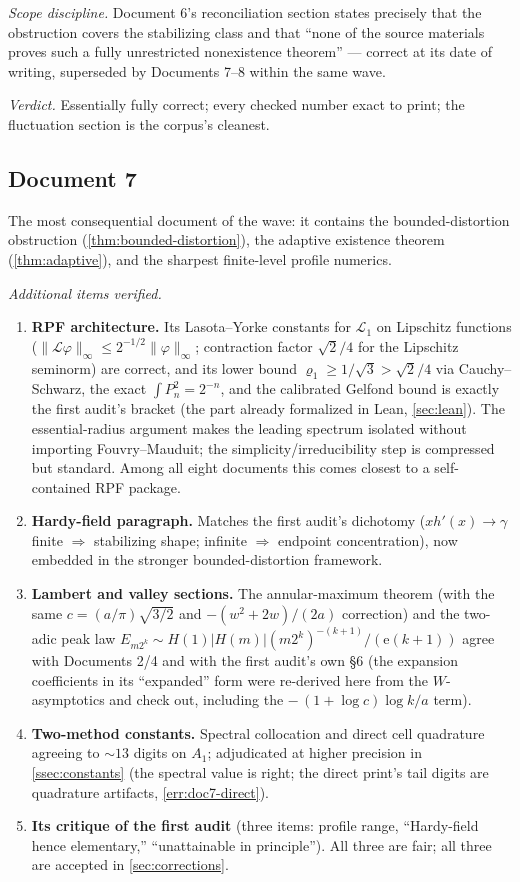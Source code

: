 \documentclass[11pt,oneside]{article}
\theoremstyle{definition}
\theoremstyle{remark}
\newcommand{\e}{\mathrm e}
\newcommand{\Lop}{\mathcal L}
\begin{document}
\emph{Scope discipline.}  Document 6's reconciliation section states
precisely that the obstruction covers the stabilizing class and that
``none of the source materials proves such a fully unrestricted
nonexistence theorem'' --- correct at its date of writing, superseded
by Documents 7--8 within the same wave.

\emph{Verdict.}  Essentially fully correct; every checked number exact
to print; the fluctuation section is the corpus's cleanest.

\subsection{Document 7}
\label{ssec:doc7}

The most consequential document of the wave: it contains the
bounded-distortion obstruction (\cref{thm:bounded-distortion}), the
adaptive existence theorem (\cref{thm:adaptive}), and the sharpest
finite-level profile numerics.

\emph{Additional items verified.}
\begin{enumerate}
\item \textbf{RPF architecture.}  Its Lasota--Yorke constants for
$\Lop_1$ on Lipschitz functions ($\|\Lop\varphi\|_\infty\le
2^{-1/2}\|\varphi\|_\infty$; contraction factor $\sqrt2/4$ for the
Lipschitz seminorm) are correct, and its lower bound
$\varrho_1\ge1/\sqrt3>\sqrt2/4$ via Cauchy--Schwarz, the exact
$\int P_n^2=2^{-n}$, and the calibrated Gelfond bound is exactly the
first audit's bracket (the part already formalized in Lean,
\cref{sec:lean}).  The essential-radius argument makes the leading
spectrum isolated without importing Fouvry--Mauduit; the
simplicity/irreducibility step is compressed but standard.  Among all
eight documents this comes closest to a self-contained RPF package.
\item \textbf{Hardy-field paragraph.}  Matches the first audit's
dichotomy ($xh'(x)\to\gamma$ finite $\Rightarrow$ stabilizing shape;
infinite $\Rightarrow$ endpoint concentration), now embedded in the
stronger bounded-distortion framework.
\item \textbf{Lambert and valley sections.}  The annular-maximum
theorem (with the same $c=(a/\pi)\sqrt{3/2}$ and
$-(w^2+2w)/(2a)$ correction) and the two-adic peak law
$E_{m2^k}\sim H(1)|H(m)|(m2^k)^{-(k+1)}/(\e(k+1))$ agree with
Documents 2/4 and with the first audit's own \S6 (the expansion
coefficients in its ``expanded'' form were re-derived here from the
$W$-asymptotics and check out, including the $-\,(1+\log c)\log k/a$
term).
\item \textbf{Two-method constants.}  Spectral collocation and direct
cell quadrature agreeing to $\sim\!13$ digits on $A_1$; adjudicated at
higher precision in \cref{ssec:constants} (the spectral value is right;
the direct print's tail digits are quadrature artifacts,
\cref{err:doc7-direct}).
\item \textbf{Its critique of the first audit} (three items: profile
range, ``Hardy-field hence elementary,'' ``unattainable in
principle'').  All three are fair; all three are accepted in
\cref{sec:corrections}.
\end{enumerate}
\end{document}
